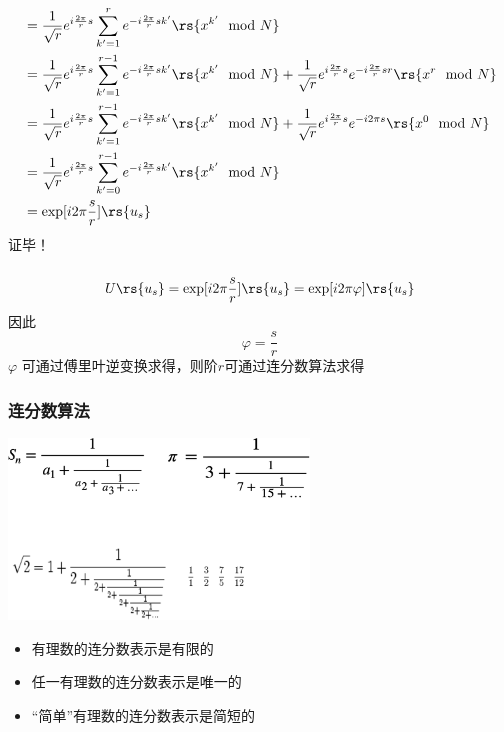 \begin{frame}
    \frametitle{}        
    \[\begin{aligned}
    &= \frac{1}{\sqrt{r}} e^{i \frac{2\pi}{r}s }  \sum_{k'=1} ^{r}  e^{-i \frac{2\pi}{r} sk' } \rs{x^{k'} \mod N} \\
    &= \frac{1}{\sqrt{r}} e^{i \frac{2\pi}{r}s }  \sum_{k'=1} ^{r-1}  e^{-i \frac{2\pi}{r} sk' } \rs{x^{k'} \mod N} 
    + \frac{1}{\sqrt{r}} e^{i \frac{2\pi}{r}s }  e^{-i \frac{2\pi}{r} s r } \rs{x^{r} \mod N} \\
    &= \frac{1}{\sqrt{r}} e^{i \frac{2\pi}{r}s }  \sum_{k'=1} ^{r-1}  e^{-i \frac{2\pi}{r} sk' } \rs{x^{k'} \mod N} 
    + \frac{1}{\sqrt{r}} e^{i \frac{2\pi}{r}s }  e^{-i 2\pi s } \rs{x^{0} \mod N} \\
    &= \frac{1}{\sqrt{r}} e^{i \frac{2\pi}{r}s }  \sum_{k'=0} ^{r-1}  e^{-i \frac{2\pi}{r} sk' } \rs{x^{k'} \mod N} \\
    &=\exp[i2\pi\frac{s}{r}] \rs{u_s}
    \end{aligned}\]  
    证毕！ 
\end{frame}

\begin{frame}
    \frametitle{}  
    \[U\rs{u_s}=\exp[i2\pi\frac{s}{r}] \rs{u_s} = \exp[i2\pi\varphi] \rs{u_s}\]
    因此
    \[\varphi=\frac{s}{r}\]
    $\varphi$ 可通过傅里叶逆变换求得，则阶$r$可通过连分数算法求得
\end{frame}

\begin{frame}
    \frametitle{连分数算法}  
    \begin{center}
        \includegraphics[width=0.6\textwidth]{figs/39.png}
    \end{center}
    \begin{itemize}
        \item 有理数的连分数表示是有限的
        \item 任一有理数的连分数表示是唯一的
        \item “简单”有理数的连分数表示是简短的
        
    \end{itemize}  
\end{frame}